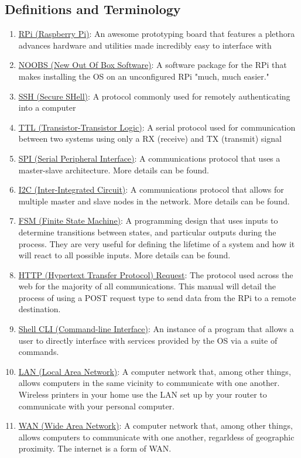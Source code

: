 \documentclass{article}
\newcommand{\createterm}[3]{
      \item \href{#1}{#2}: #3
} %
\begin{document}
  \subsection{Definitions and Terminology}
    \begin{enumerate}
        \createterm{https://en.wikipedia.org/wiki/Raspberry\_Pi}{RPi (Raspberry Pi)}{An awesome prototyping board that features a plethora advances hardware and utilities made incredibly easy to interface with}
      \createterm{https://www.raspberrypi.org/blog/introducing-noobs/}{NOOBS (New Out Of Box Software)}{A software package for the RPi that makes installing the OS on an unconfigured RPi "much, much easier."}
      \createterm{https://en.wikipedia.org/wiki/Secure\_Shell}{SSH (Secure SHell)}{A protocol commonly used for remotely authenticating into a computer}
      \createterm{https://en.wikipedia.org/wiki/Transistor\%E2\%80\%93transistor\_logic}{TTL (Transistor-Transistor Logic)}{A serial protocol used for communication between two systems using only a RX (receive) and TX (transmit) signal}
      \createterm{https://en.wikipedia.org/wiki/Serial\_Peripheral\_Interface\_Bus}{SPI (Serial Peripheral Interface)}{A communications protocol that uses a master-slave architecture. More details can be found.}
      \createterm{https://en.wikipedia.org/wiki/I\%C2\%B2C}{I2C (Inter-Integrated Circuit)}{A communications protocol that allows for multiple master and slave nodes in the network. More details can be found.}
      \createterm{https://en.wikipedia.org/wiki/Finite-state\_machine}{FSM (Finite State Machine)}{A programming design that uses inputs to determine transitions between states, and particular outputs during the process. They are very useful for defining the lifetime of a system and how it will react to all possible inputs. More details can be found.}
      \createterm{https://en.wikipedia.org/wiki/Hypertext\_Transfer\_Protocol#Request\_methods}{HTTP (Hypertext Transfer Protocol) Request}{The protocol used across the web for the majority of all communications. This manual will detail the process of using a POST request type to send data from the RPi to a remote destination.}
      \createterm{https://en.wikipedia.org/wiki/Command-line\_interface}{Shell CLI (Command-line Interface)}{An instance of a program that allows a user to directly interface with services provided by the OS via a suite of commands.}
      \createterm{https://en.wikipedia.org/wiki/Local\_area\_network}{LAN (Local Area Network)}{A computer network that, among other things, allows computers in the same vicinity to communicate with one another. Wireless printers in your home use the LAN set up by your router to communicate with your personal computer.}
      \createterm{https://en.wikipedia.org/wiki/Wide\_area\_network}{WAN (Wide Area Network)}{A computer network that, among other things, allows computers to communicate with one another, regarldess of geographic proximity. The internet is a form of WAN.}
    \end{enumerate}
\end{document}
